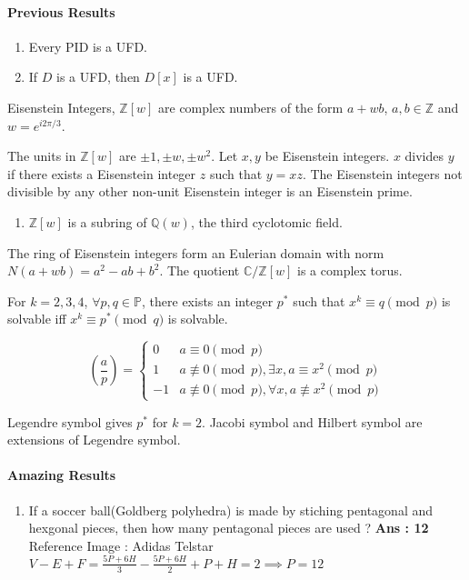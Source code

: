 \paragraph{Previous Results}
\begin{enumerate}
	\item Every PID is a UFD.
	\item If $D$ is a UFD, then $D[x]$ is a UFD.
\end{enumerate}

\begin{definition}
	Eisenstein Integers, $\mathbb{Z}[w]$ are complex numbers of the form $a+wb$, $a,b \in \mathbb{Z}$ and $w = e^{i2\pi/3}$.
\end{definition}
	The units in $\mathbb{Z}[w]$ are $\pm 1, \pm w, \pm w^2$.
	Let $x,y$ be Eisenstein integers. $x$ divides $y$ if there exists a Eisenstein integer $z$ such that $y = xz$.
	The Eisenstein integers not divisible by any other non-unit Eisenstein integer is an Eisenstein prime.
	\begin{enumerate}
		\item $\mathbb{Z}[w]$ is a subring of $\mathbb{Q}(w)$, the third cyclotomic field.
	\end{enumerate}
	The ring of Eisenstein integers form an Eulerian domain with norm $N(a+wb) = a^2-ab+b^2$.
	The quotient $\mathbb{C}/\mathbb{Z}[w]$ is a complex torus.

\begin{theorem}
	For $k = 2,3,4$, $\forall p,q \in \mathbb{P}$, there exists an integer $p^\ast$ such that $x^k \equiv q \pmod{p}$ is solvable iff $x^k \equiv p^\ast \pmod{q}$ is solvable.
\end{theorem}

\begin{definition}
	$$\left(\frac{a}{p}\right) = \begin{cases} 0 & a \equiv 0 \pmod{p} \\ 1 & a \not\equiv 0 \pmod{p}, \exists x, a \equiv x^2 \pmod{p} \\ -1 & a \not\equiv 0 \pmod{p}, \forall x, a \not\equiv x^2 \pmod{p} \end{cases}$$
\end{definition}
	Legendre symbol gives $p^\ast$ for $k=2$.
	Jacobi symbol and Hilbert symbol are extensions of Legendre symbol.

\paragraph{Amazing Results}
\begin{enumerate}
	\item If a soccer ball(Goldberg polyhedra) is made by stiching pentagonal and hexgonal pieces, then how many pentagonal pieces are used ? \textbf{Ans : 12} \\Reference Image : Adidas Telstar\\
		$V - E + F = \frac{5P+6H}{3} - \frac{5P+6H}{2} + P + H = 2 \implies P = 12$
\end{enumerate}
